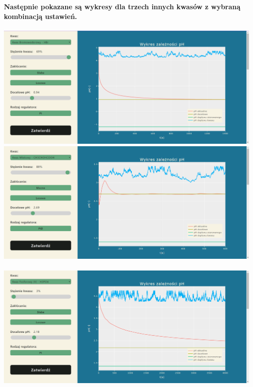 \documentclass[polish,polish,a4paper,12pt]{article}
\begin{document}
	\begin{center}
		\textbf{Następnie pokazane są wykresy dla trzech innych kwasów z wybraną kombinacją ustawień.}\\
		\hspace{0em}\\
		\includegraphics[scale=0.4]{bromowodorowy_69_0_94}
		\includegraphics[scale=0.4]{mlekowy_88_2_69}\\
		\hspace{0em}\\
		\includegraphics[scale=0.4]{fosforowy}
	\end{center}
	
\end{document}
